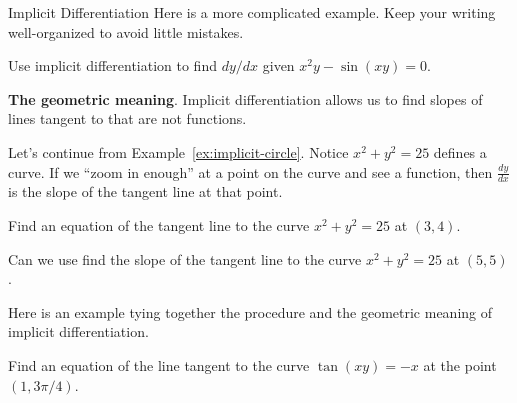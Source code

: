 \documentclass[../main.tex]{subfiles}
\begin{document}
\begin{lesson}{Implicit Differentiation}
  Here is a more complicated example. Keep your writing well-organized to avoid little mistakes.
  \begin{example}
    Use implicit differentiation to find \(dy/dx\) given \(x^{2}y - \sin(xy) = 0\).

  \end{example}

  \clearpage
  \textbf{The geometric meaning}. Implicit differentiation allows us to find slopes of lines tangent to  that are not functions. 

  Let's continue from Example~\ref{ex:implicit-circle}. Notice \(x^{2} + y^{2} = 25\) defines a curve. If we ``zoom in enough'' at a point on the curve and see a function, then \(\tfrac{dy}{dx}\) is the slope of the tangent line at that point. 


  \begin{example}
    Find an equation of the tangent line to the curve \(x^{2} + y^{2} = 25\) at \((3,4)\).
  \end{example}

  \faComment{} Can we use find the slope of the tangent line to the curve \(x^{2} + y^{2} = 25\) at \((5,5)\).

  \clearpage
  Here is an example tying together the procedure and the geometric meaning of implicit differentiation.
  \begin{example}
    Find an equation of the line tangent to the curve \(\tan(xy) = -x\) at the point \((1,3\pi/4)\).
  \end{example}
\end{lesson}
\end{document}
